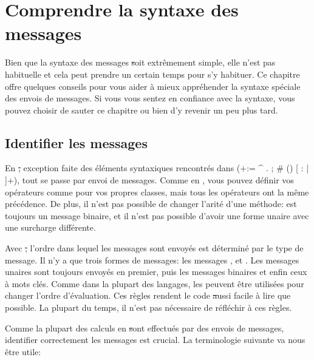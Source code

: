 \documentclass[a4paper,10pt,twoside]{book}
\begin{document}
	\renewcommand{\nnbb}[2]{} %
	\sloppy
\fi
\chapter{Comprendre la syntaxe des messages}
\label{cha:understanding}

Bien que la syntaxe des messages \st soit extr\^emement simple, elle n'est pas habituelle et cela peut prendre un certain temps pour s'y habituer. Ce chapitre offre quelques conseils pour vous aider \`a mieux appr\'ehender la syntaxe sp\'eciale des envois de messages.
Si vous vous sentez en confiance avec la syntaxe, vous pouvez choisir de sauter ce chapitre ou bien d'y revenir un peu plus tard.


\section{Identifier les messages}

En \st, exception faite des \'el\'ements syntaxiques rencontr\'es dans
 (\ct+:= ^ . ; # () {} [ : | ]+), tout se passe par envoi de messages.
Comme en , vous pouvez d\'efinir vos op\'erateurs comme \ct{+} pour vos propres classes, mais tous les op\'erateurs ont la m\^eme pr\'ec\'edence.
De plus, il n'est pas possible de changer l'arit\'e d'une m\'ethode:
\ct{-} est toujours un message binaire, et il n'est pas possible
d'avoir une forme unaire avec une surcharge diff\'erente.

Avec \st, l'ordre dans lequel les messages sont envoy\'es est
d\'etermin\'e par le type de message. Il n'y a que trois formes de
messages: les messages ,  et . Les messages unaires sont toujours envoy\'es en premier, puis les messages binaires et enfin ceux \`a mots cl\'es. Comme dans la plupart des langages,  les  peuvent \^etre utilis\'ees pour changer l'ordre d'\'evaluation. Ces r\`egles rendent le code \st aussi facile \`a lire que possible. La plupart du temps, il n'est pas n\'ecessaire de r\'efl\'echir \`a ces r\`egles.

Comme la plupart des calculs en \st sont effectu\'es par des envois de messages, identifier correctement les messages est crucial. La terminologie suivante va nous \^etre utile:
\end{document}
